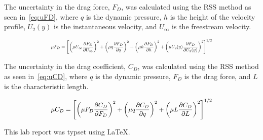 \documentclass[journal,letterpaper]{IEEEtran}
\begin{document}
The uncertainty in the drag force, $F_D$, was calculated using the RSS method as seen in~\eqref{eq:uFD}, where $q$ is the dynamic pressure, $h$ is the height of the velocity profile, $U_2 (y)$ is the instantaneous velocity, and $U_\infty$ is the freestream velocity.

\begin{equation} \label{eq:uFD}
    \resizebox{227pt}{!}{$\displaystyle{\mu F_D = \left[\left(\mu U_\infty \frac{\partial F_D}{\partial U_\infty}\right)^2 + \left(\mu q \frac{\partial F_D}{\partial q}\right)^2 + \left(\mu h \frac{\partial F_D}{\partial h}\right)^2 + \left(\mu U_2 (y) \frac{\partial F_D}{\partial U_2 (y)}\right)^2\right]^{1/2}}$}
\end{equation}

The uncertainty in the drag coefficient, $C_D$, was calculated using the RSS method as seen in~\eqref{eq:uCD}, where $q$ is the dynamic pressure, $F_D$ is the drag force, and $L$ is the characteristic length.

\begin{equation} \label{eq:uCD}
    \resizebox{227pt}{!}{$\displaystyle{\mu C_D = \left[\left(\mu F_D \frac{\partial C_D}{\partial F_D}\right)^2 + \left(\mu q \frac{\partial C_D}{\partial q}\right)^2 + \left(\mu L \frac{\partial C_D}{\partial L}\right)^2\right]^{1/2}}$}
\end{equation}

\noindent
This lab report was typset using \LaTeX.
\end{document}

